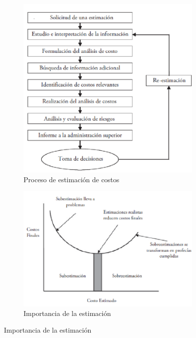\begin{figure}[H]
    \centering
    \begin{subfigure}[b]{0.45\textwidth}
        \centering
        \includegraphics[width=\textwidth]{FOTOS/est_costos.png} %
        \caption{Proceso de estimación de costos}
        \label{fig:imagen1}
    \end{subfigure}
    \hfill
    \begin{subfigure}[b]{0.45\textwidth}
        \centering
        \includegraphics[width=\textwidth]{FOTOS/sub_costo.png} %
        \caption{Importancia de la estimación}
        \label{fig:imagen2}
    \end{subfigure}
    \label{fig:imagenes_juntas}
\end{figure}

